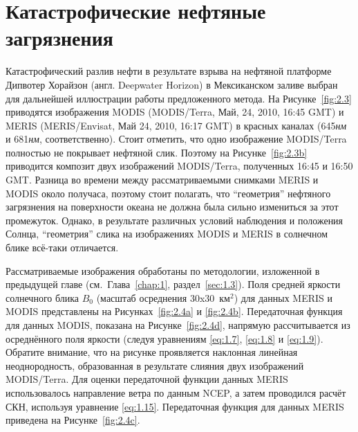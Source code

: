 \section{Катастрофические нефтяные загрязнения}

Катастрофический разлив нефти в результате взрыва на нефтяной платформе Дипвотер Хорайзон (англ. Deepwater Horizon) в Мексиканском заливе выбран для дальнейшей иллюстрации работы предложенного метода. На Рисунке~\ref{fig:2.3} приводятся изображения MODIS (MODIS/Terra, Май, 24, 2010, 16:45 GMT) и MERIS (MERIS/Envisat, Май 24, 2010, 16:17 GMT) в красных каналах (645\textit{нм} и 681\textit{нм}, соответственно). Стоит отметить, что одно изображение MODIS/Terra полностью не покрывает нефтяной слик. Поэтому на Рисунке~\ref{fig:2.3b} приводится композит двух изображений MODIS/Terra, полученных 16:45 и 16:50 GMT. Разница во времени между рассматриваемыми снимками MERIS и MODIS около получаса, поэтому стоит полагать, что ``геометрия'' нефтяного загрязнения на поверхности океана не должна была сильно измениться за этот промежуток. Однако, в результате различных условий наблюдения и положения Солнца, ``геометрия'' слика на изображениях MODIS и MERIS в солнечном блике всё-таки отличается.

Рассматриваемые изображения обработаны по методологии, изложенной в предыдущей главе (см.~Глава~\ref{chap:1}, раздел~\ref{sec:1.3}). Поля средней яркости солнечного блика $B_{0} $ (масштаб осреднения 30x30~км${}^{2}$) для данных MERIS и MODIS представлены на Рисунках~\ref{fig:2.4a} и \ref{fig:2.4b}. Передаточная функция для данных MODIS, показана на Рисунке~\ref{fig:2.4d}, напрямую рассчитывается из осреднённого поля яркости (следуя уравнениям \eqref{eq:1.7}, \eqref{eq:1.8} и \eqref{eq:1.9}). Обратите внимание, что на рисунке проявляется наклонная линейная неоднородность, образованная в результате слияния двух изображений MODIS/Terra. Для оценки передаточной функции данных MERIS использовалось направление ветра по данным NCEP, а затем проводился расчёт СКН, используя уравнение \eqref{eq:1.15}. Передаточная функция для данных MERIS приведена на Рисунке~\ref{fig:2.4c}.



